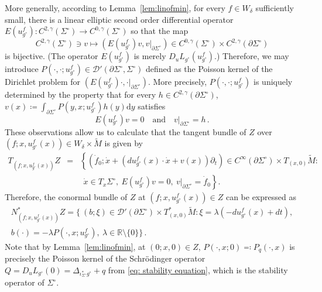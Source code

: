 \documentclass[11pt]{amsart}
\theoremstyle{definition}
\numberwithin{equation}{section}
\newcommand{\mR}{\mathbb{R}}                    %
\newcommand{\p}{\partial}
\newcommand{\dd}{\mathrm{d}}
\begin{document}
More generally, according to Lemma~\ref{lem:linofmin}, for every $f\in W_\delta$ sufficiently small, there is a linear elliptic second order differential operator $E(u_{g^\circ}^f) \colon C^{2,\gamma}(\Sigma^\circ)\to C^{0,\gamma}(\Sigma^\circ)$
so that the map 
\[
C^{2,\gamma}(\Sigma^\circ) \ni v\mapsto (E(u_{g^\circ}^f)v,v\vert_{\partial\Sigma^\circ})\in C^{0,\gamma}(\Sigma^\circ)\times C^{2,\gamma}(\partial\Sigma^\circ)
\]
is bijective. (The operator $E(u^f_{g^\circ})$ is merely $D_u L_{g^\circ}(u^f_{g^\circ})$.) Therefore, we may introduce $P(\cdot,\cdot; u^f_{g^\circ}) \in \mathcal D'(\partial \Sigma^\circ, \Sigma^\circ)$ defined as the Poisson kernel of the Dirichlet problem for $(E(u^f_{g^\circ})\cdot,\cdot\vert_{\p\Sigma^\circ})$. %
More precisely, $P(\cdot,\cdot;u^{f}_{g^\circ})$ is uniquely determined by the property that for every $h\in C^{2,\gamma}(\partial\Sigma^\circ)$, $ v(x)\coloneqq\int_{\partial\Sigma^\circ} P(y,x;u^f_{g^\circ})h(y)\dd y$ satisfies
\[
	E(u^f_{g^\circ})v=0\quad\text{and}\quad v\vert_{\partial\Sigma^\circ}= h\,.
\]
These observations allow us to calculate that the tangent bundle of $Z$ over $(f; x, u_{g^\circ}^f(x))\in W_\delta\times \widetilde{M}$ is given by
\begin{eqnarray}\label{eq: tangent space of Z'}
T_{(f; x,u_{g^\circ}^f(x))}Z &= &\left\{(\dot f_0; \dot x +( du^f_{g^\circ}(x) \cdot \dot x  + v(x) )\partial_t) \in C^\infty(\partial\Sigma^\circ)\times T_{(x,0)}\widetilde{M}\colon\right.\\\nonumber && \ \ \left.\dot x \in T_x\Sigma^\circ, \ E(u^f_{g^\circ})v = 0,\ v\vert_{\partial\Sigma^\circ} = \dot f_0\right\}.
\end{eqnarray} 
Therefore, the conormal bundle of $Z$ at $(f;x,u^f_{g^\circ}(x)) \in Z$ can be expressed as 
\begin{multline}\label{eq: conormal of Z}
N^*_{(f;x,u^f_{g^\circ}(x))} Z=\Big\{ \ (b; \xi) \in \mathcal{D}'(\partial \Sigma^\circ) \times T^*_{(x,0)}\widetilde{M}\colon \xi =\lambda(-du^f_{g^\circ}(x)+ dt), \\
 b(\cdot) = -\lambda P(\cdot,x;u^f_{g^\circ}), \ \lambda \in \mR \setminus \{0\} \Big\}\,.
\end{multline}
Note that by Lemma~\ref{lem:linofmin}, at $(0; x, 0)\in Z$, $P(\cdot, x; 0) \eqqcolon P_q(\cdot, x)$ is precisely the Poisson kernel of the Schr\"odinger operator $Q = D_uL_{g^\circ}(0) = \Delta_{\iota^\ast_{\Sigma^\circ}g^\circ}+q$ from \eqref{eq: stability equation}, which is the stability operator of $\Sigma^\circ$.
\end{document}
